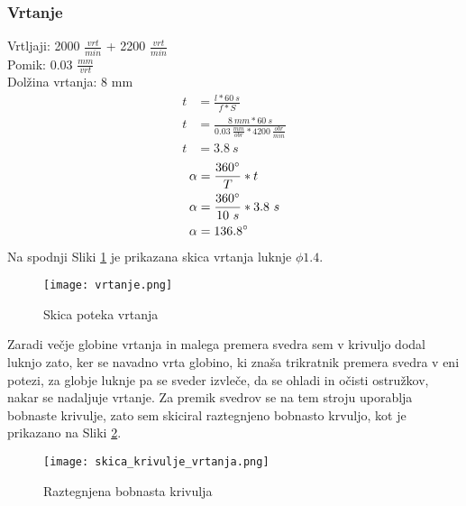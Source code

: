 \subsubsection{Vrtanje}
Vrtljaji: 2000 \( \frac{vrt}{min} \) + 2200 \( \frac{vrt}{min} \)\\
Pomik: 0.03 \( \frac{mm}{vrt} \) \\
Dolžina vrtanja: 8 mm
\begin{equation}
	\begin{split}
		t &= \frac{l*60\ s}{f*S} \\
		t &= \frac{8\ mm*60\ s}{0.03\ \frac{mm}{obr}*4200\ \frac{obr}{min}} \\
		t &= 3.8\ s
	\end{split}
\end{equation}
\begin{equation}
	\begin{split}
		\alpha &= \frac{360\degree}{T} * t \\
		\alpha &= \frac{360\degree}{10\ s} * 3.8\ s\\
		\alpha &= 136.8\degree
	\end{split}
\end{equation}
Na spodnji Sliki \ref{vrtanje} je prikazana skica vrtanja
luknje $\phi 1.4$.
\begin{figure}[H]
	\begin{center}
		\texttt{[image: vrtanje.png]}
		\caption{Skica poteka vrtanja
			\cite{lasten}}
		\label{vrtanje}
	\end{center}
\end{figure}
Zaradi večje globine vrtanja in malega premera svedra
sem v krivuljo dodal luknjo zato, ker se navadno vrta globino, ki znaša trikratnik
premera svedra v eni potezi, za globje luknje pa se sveder
izvleče, da se ohladi in očisti ostružkov, nakar se nadaljuje vrtanje.
Za premik svedrov se na tem stroju uporablja bobnaste krivulje,
zato sem skiciral raztegnjeno bobnasto krvuljo, kot je prikazano
na Sliki \ref{raztegnjen_boben}.
\begin{figure}[H]
	\begin{center}
		\texttt{[image: skica\_krivulje\_vrtanja.png]}
		\caption{Raztegnjena bobnasta krivulja
			\cite{lasten}}
		\label{raztegnjen_boben}
	\end{center}
\end{figure}
\newpage
